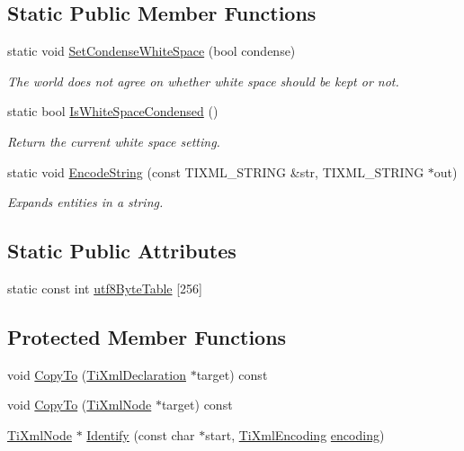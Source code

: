 \subsection*{Static Public Member Functions}
\begin{DoxyCompactItemize}
\item 
static void \hyperlink{classTiXmlBase_a0f799ec645bfb8d8a969e83478f379c1}{SetCondenseWhiteSpace} (bool condense)
\begin{DoxyCompactList}\small\item\em The world does not agree on whether white space should be kept or not. \item\end{DoxyCompactList}\item 
static bool \hyperlink{classTiXmlBase_ad4b1472531c647a25b1840a87ae42438}{IsWhiteSpaceCondensed} ()
\begin{DoxyCompactList}\small\item\em Return the current white space setting. \item\end{DoxyCompactList}\item 
static void \hyperlink{classTiXmlBase_a32ed202562b58de64c7d799ca3c9db98}{EncodeString} (const TIXML\_\-STRING \&str, TIXML\_\-STRING $\ast$out)
\begin{DoxyCompactList}\small\item\em Expands entities in a string. \item\end{DoxyCompactList}\end{DoxyCompactItemize}
\subsection*{Static Public Attributes}
\begin{DoxyCompactItemize}
\item 
static const int \hyperlink{classTiXmlBase_ac8c86058137bdb4b413c3eca58f2d467}{utf8ByteTable} \mbox{[}256\mbox{]}
\end{DoxyCompactItemize}
\subsection*{Protected Member Functions}
\begin{DoxyCompactItemize}
\item 
void \hyperlink{classTiXmlDeclaration_a9d08959f935421a593032bd3efb30c38}{CopyTo} (\hyperlink{classTiXmlDeclaration}{TiXmlDeclaration} $\ast$target) const 
\item 
void \hyperlink{classTiXmlNode_ab6056978923ad8350fb5164af32d8038}{CopyTo} (\hyperlink{classTiXmlNode}{TiXmlNode} $\ast$target) const 
\item 
\hyperlink{classTiXmlNode}{TiXmlNode} $\ast$ \hyperlink{classTiXmlNode_ac1e3a8e7578be463b04617786120c2bb}{Identify} (const char $\ast$start, \hyperlink{tinyxml_8h_a88d51847a13ee0f4b4d320d03d2c4d96}{TiXmlEncoding} \hyperlink{classTiXmlDeclaration_a24b8645d7696ec169bbb3fb7d30860cf}{encoding})
\end{DoxyCompactItemize}

